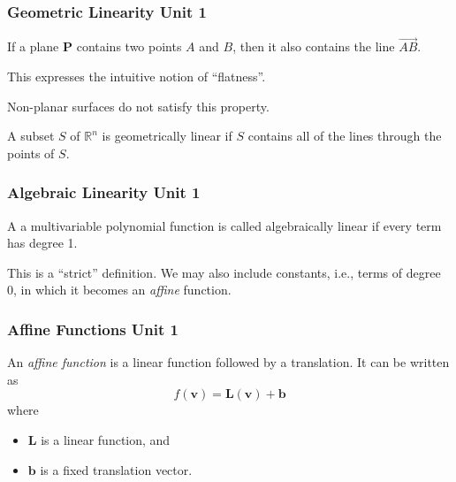 \documentclass[12pt]{beamer}
\newcommand{\FrameTitle}[2]{\frametitle{#1 \hfill \small\textnormal{\textcolor{midgray}{#2}}}}
\newcommand{\ThreePtVspace}{\vspace*{3pt}}
\newcommand{\vsp}{\vspace*{1em}}
\newcommand{\Matrix}[1]{\textbf{#1}}
\newcommand{\Vector}[1]{\textbf{#1}}
\begin{document}
\begin{frame}\FrameTitle{Geometric Linearity}{Unit 1}
    \begin{definition}[]
        If a plane $\mathbf{P}$ contains two points
        $A$ and $B$, then it also contains the line $\overrightarrow{AB}$.
    \end{definition}

    \ThreePtVspace
    This expresses the intuitive notion of ``flatness''.

    \ThreePtVspace\ThreePtVspace

    Non-planar surfaces do not satisfy this property.

    \vsp
    \begin{definition}
        A subset $S$ of $\mathbb{R}^n$ is geometrically linear if $S$
        contains all of the lines through the points of $S$.
    \end{definition}
\end{frame}

\begin{frame}\FrameTitle{Algebraic Linearity}{Unit 1}
    \begin{definition}[]
        A a multivariable polynomial function is called
        algebraically linear if every term has degree 1.
    \end{definition}

    \vsp\vsp
    This is a ``strict'' definition. We may also include
    constants, i.e., terms of degree 0, in which it becomes
    an \emph{affine} function.
\end{frame}

\begin{frame}\FrameTitle{Affine Functions}{Unit 1}
    \begin{definition}
        An \emph{affine function} is a linear function followed by a
        translation. It can be written as
        \[
            f(\Vector{v}) = \Matrix{L}(\Vector{v}) + \Vector{b}
        \]
        where
        \begin{itemize}
            \item $\Matrix{L}$ is a linear function, and
            \item $\Vector{b}$ is a fixed translation vector.
        \end{itemize}
    \end{definition}
\end{frame}
\end{document}
